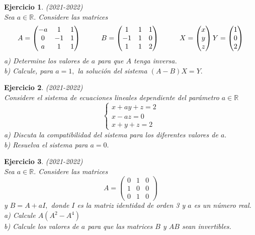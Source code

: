 \documentclass[12pt, a4paper]{amsart}
\newtheorem{ejer}{Ejercicio}
\begin{document}
\begin{ejer}\em (2021-2022)\\
Sea $a\in\mathbb{R}.$ Considere las matrices
\[
A=\begin{pmatrix}
-a & 1 & 1\\
0 & -1 & 1\\
a & 1 & 1
\end{pmatrix}\hspace*{1cm} 
B=\begin{pmatrix}
1 & 1 & 1\\
-1 & 1 & 0\\
1 & 1 & 2
\end{pmatrix}\hspace*{1cm}
X=\begin{pmatrix}
x\\
y\\
z
\end{pmatrix}
Y=\begin{pmatrix}
1\\
0\\
2
\end{pmatrix}
\]
a) Determine los valores de $a$ para que $A$ tenga inversa.\\
b) Calcule, para $a=1,$ la solución del sistema $(A - B)X = Y.$ 
\end{ejer}

\begin{ejer}\em (2021-2022)\\
Considere el sistema de ecuaciones lineales dependiente del parámetro  $a\in\mathbb{R}$
\begin{equation*}
\left \{ \begin{matrix} x+ay+z=2
\\ x-az=0
\\x+y+z=2 \end{matrix}\right. 
\end{equation*}
a) Discuta la compatibilidad del sistema para los diferentes valores de $a.$\\
b) Resuelva el sistema para $a = 0.$
\end{ejer}

\begin{ejer}\em (2021-2022)\\
Sea $a\in\mathbb{R}.$ Considere las matrices
\[
A=\begin{pmatrix}
0 & 1 & 0\\
1 & 0 & 0\\
0 & 1 & 0
\end{pmatrix}\]
y $B = A + aI,$ donde $I$ es la matriz identidad de orden 3 y $a$ es un número real.\\
a) Calcule $A(A^2 - A^4 )$\\
b) Calcule los valores de $a$ para que las matrices $B$ y $AB$ sean invertibles.
\end{ejer}
\end{document}
